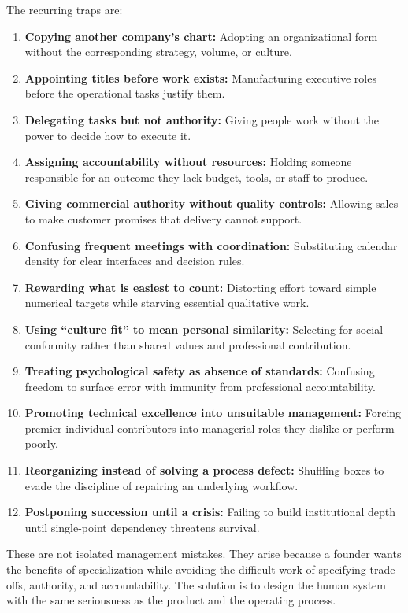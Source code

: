 The recurring traps are:
\begin{enumerate}
    \item \textbf{Copying another company's chart:} Adopting an organizational form without the corresponding strategy, volume, or culture.
    \item \textbf{Appointing titles before work exists:} Manufacturing executive roles before the operational tasks justify them.
    \item \textbf{Delegating tasks but not authority:} Giving people work without the power to decide how to execute it.
    \item \textbf{Assigning accountability without resources:} Holding someone responsible for an outcome they lack budget, tools, or staff to produce.
    \item \textbf{Giving commercial authority without quality controls:} Allowing sales to make customer promises that delivery cannot support.
    \item \textbf{Confusing frequent meetings with coordination:} Substituting calendar density for clear interfaces and decision rules.
    \item \textbf{Rewarding what is easiest to count:} Distorting effort toward simple numerical targets while starving essential qualitative work.
    \item \textbf{Using ``culture fit'' to mean personal similarity:} Selecting for social conformity rather than shared values and professional contribution.
    \item \textbf{Treating psychological safety as absence of standards:} Confusing freedom to surface error with immunity from professional accountability.
    \item \textbf{Promoting technical excellence into unsuitable management:} Forcing premier individual contributors into managerial roles they dislike or perform poorly.
    \item \textbf{Reorganizing instead of solving a process defect:} Shuffling boxes to evade the discipline of repairing an underlying workflow.
    \item \textbf{Postponing succession until a crisis:} Failing to build institutional depth until single-point dependency threatens survival.
\end{enumerate}

These are not isolated management mistakes. They arise because a founder wants the benefits of specialization while avoiding the difficult work of specifying trade-offs, authority, and accountability. The solution is to design the human system with the same seriousness as the product and the operating process.
